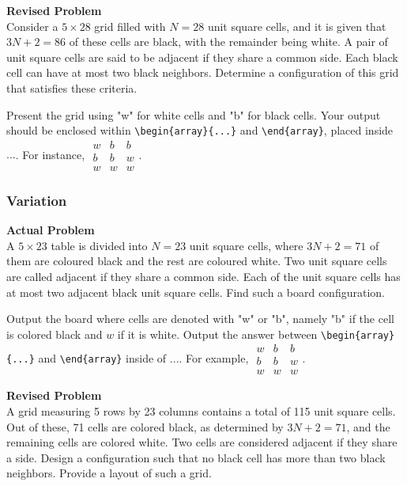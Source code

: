 \textbf{Revised Problem}\\
Consider a $5 \times 28$ grid filled with $N=28$ unit square cells, and it is given that $3N+2=86$ of these cells are black, with the remainder being white. A pair of unit square cells are said to be adjacent if they share a common side. Each black cell can have at most two black neighbors. Determine a configuration of this grid that satisfies these criteria.

Present the grid using "w" for white cells and "b" for black cells. Your output should be enclosed within \verb|\begin{array}{...}| and \verb|\end{array}|, placed inside $\boxed{...}$. For instance, $\boxed{\begin{array}{ccc}w & b & b \\ b & b & w \\ w & w & w\end{array}}$.

\subsubsection{Variation}
\textbf{Actual Problem}\\
A $5 \times 23$ table is divided into $N=23$ unit square cells, where $3N+2=71$ of them are coloured black and the rest are coloured white. Two unit square cells are called adjacent if they share a common side. Each of the unit square cells has at most two adjacent black unit square cells. Find such a board configuration.

Output the board where cells are denoted with "w" or "b", namely "b" if the cell is colored black and $w$ if it is white. Output the answer between \verb|\begin{array}{...}| and \verb|\end{array}| inside of $\boxed{...}$. For example, $\boxed{\begin{array}{ccc}w & b & b \\ b & b & w \\ w & w & w\end{array}}$.

\textbf{Revised Problem}\\
A grid measuring 5 rows by 23 columns contains a total of 115 unit square cells. Out of these, 71 cells are colored black, as determined by \(3N + 2 = 71\), and the remaining cells are colored white. Two cells are considered adjacent if they share a side. Design a configuration such that no black cell has more than two black neighbors. Provide a layout of such a grid.

